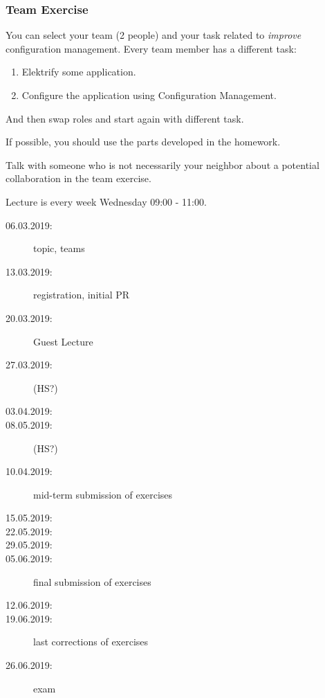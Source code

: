 \begin{frame}
	\frametitle{Team Exercise}
	You can select your team (2 people) and your task related to \emph{improve} configuration management.
	Every team member has a different task:

	\begin{enumerate}
		\item Elektrify some application.
		\item Configure the application using Configuration Management.
	\end{enumerate}

	\vspace{0.5cm}
	And then swap roles and start again with different task.

	\vspace{0.5cm}
	If possible, you should use the parts developed in the homework.
\end{frame}

\begin{assignment}
	\begin{task}
	Talk with someone who is not necessarily your neighbor about a potential collaboration in the team exercise.
	\end{task}
\end{assignment}

\begin{frame}
	Lecture is every week Wednesday 09:00 - 11:00.

	\begin{description}
		\item[06.03.2019:] topic, teams
		\item[13.03.2019:] registration, initial PR
		\item[20.03.2019:] Guest Lecture
		\item[27.03.2019:] (HS?)
		\item[03.04.2019:]
		\item[08.05.2019:] (HS?)
		\item[10.04.2019:] mid-term submission of exercises
		\item[15.05.2019:]
		\item[22.05.2019:]
		\item[29.05.2019:]
		\item[05.06.2019:] final submission of exercises
		\item[12.06.2019:]
		\item[19.06.2019:] last corrections of exercises
		\item[26.06.2019:] exam
	\end{description}
\end{frame}

